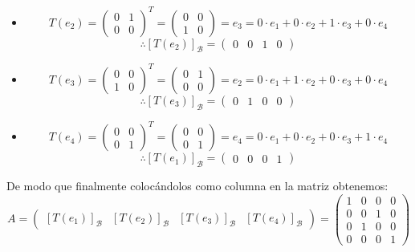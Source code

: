 \begin{itemize}
\begin{itemize}
    \item \[T(e_2)=\begin{pmatrix}
    0 & 1\\
    0 & 0
    \end{pmatrix}^T=\begin{pmatrix}
    0 & 0\\
    1 & 0
    \end{pmatrix}=e_3=0\cdot e_1+0\cdot e_2+1\cdot e_3+0\cdot e_4\]
    \[\therefore [T(e_2)]_{\mathcal{B}}=\begin{pmatrix} 0 & 0 & 1 & 0\end{pmatrix}\]
    
    \item \[T(e_3)=\begin{pmatrix}
    0 & 0\\
    1 & 0
    \end{pmatrix}^T=\begin{pmatrix}
    0 & 1\\
    0 & 0
    \end{pmatrix}=e_2=0\cdot e_1+1\cdot e_2+0\cdot e_3+0\cdot e_4\]
    \[\therefore [T(e_3)]_{\mathcal{B}}=\begin{pmatrix} 0 & 1 & 0 & 0\end{pmatrix}\]
    
    \item \[T(e_4)=\begin{pmatrix}
    0 & 0\\
    0 & 1
    \end{pmatrix}^T=\begin{pmatrix}
    0 & 0\\
    0 & 1
    \end{pmatrix}=e_4=0\cdot e_1+0\cdot e_2+0\cdot e_3+1\cdot e_4\]
    \[\therefore [T(e_1)]_{\mathcal{B}}=\begin{pmatrix} 0 & 0 & 0 & 1\end{pmatrix}\]
    \end{itemize}
    De modo que finalmente coloc\'andolos como columna en la matriz obtenemos:
    \[A= \begin{pmatrix} [T(e_1)]_{\mathcal{B}} & [T(e_2)]_{\mathcal{B}} &[T(e_3)]_{\mathcal{B}} &[T(e_4)]_{\mathcal{B}} \end{pmatrix}=\begin{pmatrix}
    1 & 0 & 0 & 0\\
    0 & 0 & 1 & 0\\
    0 & 1 & 0 & 0\\
    0 & 0 & 0 & 1\end{pmatrix}\]
    

\end{itemize}
